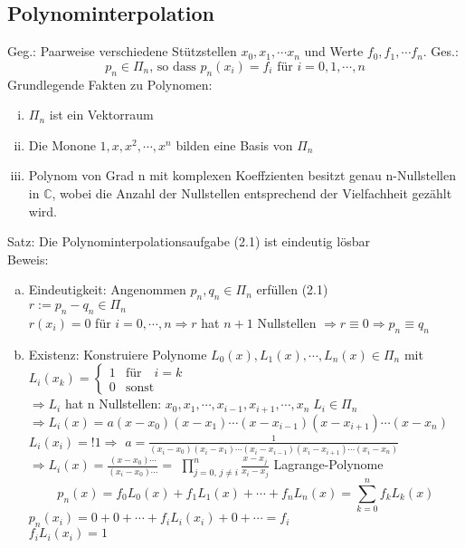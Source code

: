\subsection{Polynominterpolation}
Geg.: Paarweise verschiedene Stützstellen $x_0, x_1, \cdots x_n$ und
Werte $f_0, f_1, \cdots f_n$.
Ges.:
\begin{equation*}
  \tag{2.1} p_n \in  \Pi_n \text{, so dass } p_n(x_i) = 
  f_i \text{ für } i = 0, 1, \cdots ,n
\end{equation*}
Grundlegende Fakten zu Polynomen:
\begin{enumerate}[(i)]
  \item $\Pi_n$ ist ein Vektorraum
  \item Die Monone $1, x, x^2, \cdots, x^n$ bilden eine Basis von $\Pi_n$
  \item Polynom von Grad n mit komplexen Koeffzienten besitzt genau n-Nullstellen
    in $\mathbb{C}$, wobei die Anzahl der Nullstellen entsprechend der Vielfachheit
    gezählt wird.
\end{enumerate}
Satz: Die Polynominterpolationsaufgabe (2.1) ist eindeutig lösbar\\
Beweis:
\begin{enumerate}[(a)]
  \item Eindeutigkeit: Angenommen $p_n, q_n \in \Pi_n$ erfüllen (2.1)\\
    $r := p_n - q_n \in \Pi_n$ \\
    $r(x_i) = 0$ für $i = 0, \cdots, n \Rightarrow r$ hat $n + 1$ Nullstellen
    $\Rightarrow r \equiv 0 \Rightarrow p_n \equiv q_n$
  \item Existenz: Konstruiere Polynome $L_0(x), L_1(x), \cdots, L_n(x) \in \Pi_n$ mit\\
    $L_i(x_k)=\begin{cases} 1 & \mbox{für } \mbox{ $i = k$} \\ 
      0 & \mbox{sonst} \end{cases}$ \\
    $\Rightarrow L_i$ hat n Nullstellen: 
    $x_0, x_1, \cdots, x_{i-1}, x_{i+1}, \cdots, x_n\; L_i \in \Pi_n$\\
    $\Rightarrow L_i(x) = a(x-x_0)(x-x_1)\cdots(x-x_{i-1})(x-x_{i+1})\cdots(x-x_n)$\\
    $L_i(x_i) =! 1 \Rightarrow$
      $a = \frac{1}{(x_i-x_0)(x_i-x_1)\cdots(x_i-x_{i-1})(x_i-x_{i+1})\cdots(x_i-x_n)}$\\
    $\Rightarrow L_i(x) = \frac{(x - x_0)\cdots}{(x_i - x_0)\cdots} = $
      $\prod\limits_{j = 0,\,j \neq i}^n \frac{x - x_j}{x_i - x_j}$ Lagrange-Polynome \\
    \begin{equation*}
      \tag{2.2}
      p_n(x) = f_0 L_0(x) + f_1 L_1(x) + \cdots + f_n L_n(x) = 
      \sum\limits_{k = 0}^n f_k L_k(x)
    \end{equation*}
    $p_n(x_i) = 0 + 0 + \cdots + f_i L_i(x_i) + 0 + \cdots = f_i$\\
    $f_i L_i(x_i) = 1$
\end{enumerate}
